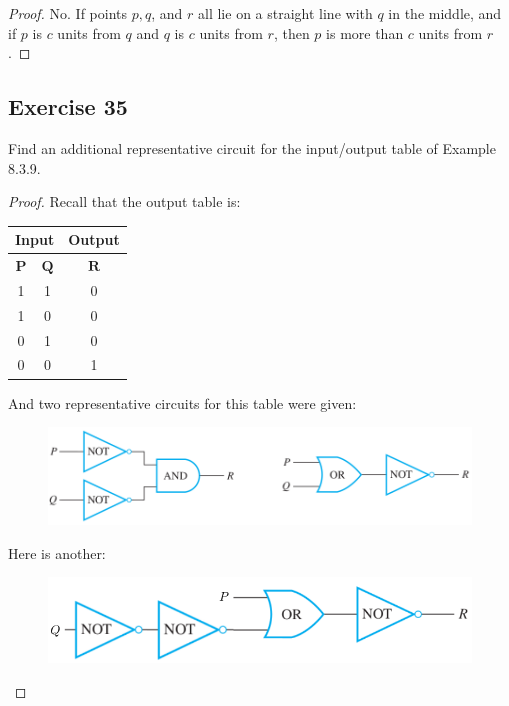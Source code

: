 \documentclass[14pt]{extarticle}
\newcommand{\cy}{\color{cyan}}
\begin{document}
\begin{proof}
No. If points \(p, q\), and $r$ all lie on a straight line with $q$ in the middle, and if $p$ is $c$ units from $q$ 
and $q$ is $c$ units from $r$, then $p$ is more than $c$ units from $r$.
\end{proof}

\subsection{Exercise 35}
Find an additional representative circuit for the input/output table of Example 8.3.9.

\begin{proof}
Recall that the output table is:

\begin{center}
\begin{tabular}{|cc|c|}
\hline
\multicolumn{2}{|c|}{\cy Input} & {\cy Output} \\
\hline
\(\bm{P}\) & \(\bm{Q}\) & \(\bm{R}\) \\
\hline
1 & 1 & 0 \\
\hline
1 & 0 & 0 \\
\hline
0 & 1 & 0 \\
\hline
0 & 0 & 1 \\
\hline
\end{tabular}
\end{center}

And two representative circuits for this table were given:

\begin{figure}[ht!]
\centering
\includegraphics[scale=0.5]{../images/8.3.35.png}
\end{figure}

Here is another:

\begin{figure}[ht!]
\centering
\includegraphics[scale=0.5]{../images/8.3.35.2.png}
\end{figure}
\end{proof}
\end{document}
